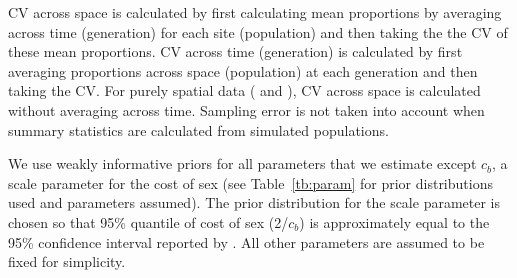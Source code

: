\documentclass{article}\usepackage[]{graphicx}\usepackage[]{color}
\begin{document}
CV across space is calculated by first calculating mean proportions by averaging across time (generation) for each site (population) and then taking the the CV of these mean proportions.
CV across time (generation) is calculated by first averaging proportions across space (population) at each generation and then taking the CV.
For purely spatial data (\cite{dagan2013clonal} and \cite{mckone2016fine}), CV across space is calculated without averaging across time.
Sampling error is not taken into account when summary statistics are calculated from simulated populations.

We use weakly informative priors for all parameters that we estimate except $c_b$, a scale parameter for the cost of sex (see Table~\ref{tb:param} for prior distributions used and parameters assumed).
The prior distribution for the scale parameter is chosen so that 95\% quantile of cost of sex (2/$c_b$) is approximately equal to the 95\% confidence interval reported by \cite{gibson2017two}.
All other parameters are assumed to be fixed for simplicity.
\end{document}
